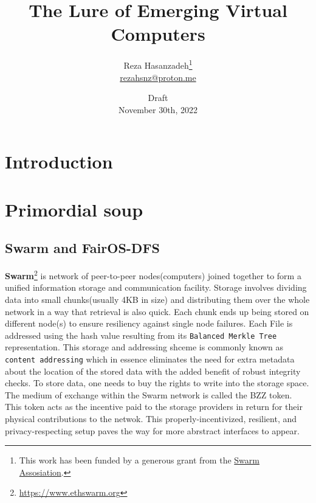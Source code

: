 \documentclass[a4paper, 10pt]{article}
\title{The Lure of Emerging Virtual Computers}
\author{Reza Hasanzadeh\thanks{This work has been funded by a generous grant from the \href{https://www.ethswarm.org
}{Swarm Assosiation}.}  \\ \href{mailto:rezahsnz@proton.me}{\small{rezahsnz@proton.me}}}
\date{\small{Draft} \\ \small{November 30th, 2022}}
\begin{document}

\maketitle

\section{Introduction}

\section{Primordial soup}

\subsection{Swarm and FairOS-DFS}
\textbf{Swarm}\footnote{\url{https://www.ethswarm.org}} is network of peer-to-peer nodes(computers) joined together to form a unified  information storage and communication facility. Storage involves dividing data into small chunks(usually 4KB in size) and distributing them over the whole network in a way that retrieval is also quick. Each chunk ends up being stored on different node(s) to ensure resiliency against single node failures. Each File is addressed using the hash value resulting from its \texttt{Balanced Merkle Tree} representation. This storage and addressing shceme is commonly known as \texttt{content addressing} which in essence eliminates the need for extra metadata about the location of the stored data with the added benefit of robust integrity checks. To store data, one needs to buy the rights to write into the storage space. The medium of exchange within the Swarm network is called the BZZ token. This token acts as the incentive paid to the storage providers in return for their physical contributions to the netwok. This properly-incentivized, resilient, and privacy-respecting setup paves the way for more abrstract interfaces to appear.
\par \noindent 
\end{document}
